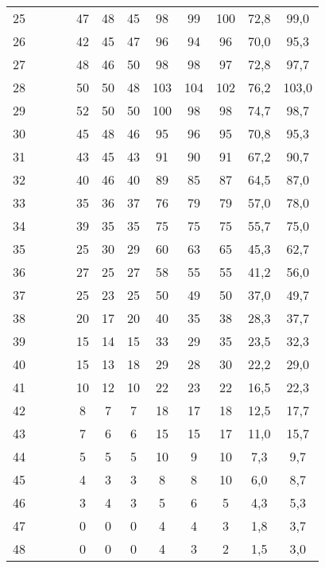 \begin{center}
\begin{longtable}{|c|c|c|c|c|c|c|c|c|c|c|c|}
		25 &   &   &   & 47 & 48 & 45 & 98  & 99  & 100 & 72,8     & 99,0   \\
		26 &   &   &   & 42 & 45 & 47 & 96  & 94  & 96  & 70,0     & 95,3   \\
		27 &   &   &   & 48 & 46 & 50 & 98  & 98  & 97  & 72,8     & 97,7   \\
		28 &   &   &   & 50 & 50 & 48 & 103 & 104 & 102 & 76,2     & 103,0  \\
		29 &   &   &   & 52 & 50 & 50 & 100 & 98  & 98  & 74,7     & 98,7   \\
		30 &   &   &   & 45 & 48 & 46 & 95  & 96  & 95  & 70,8     & 95,3   \\
		31 &   &   &   & 43 & 45 & 43 & 91  & 90  & 91  & 67,2     & 90,7   \\
		32 &   &   &   & 40 & 46 & 40 & 89  & 85  & 87  & 64,5     & 87,0   \\
		33 &   &   &   & 35 & 36 & 37 & 76  & 79  & 79  & 57,0     & 78,0   \\
		34 &   &   &   & 39 & 35 & 35 & 75  & 75  & 75  & 55,7     & 75,0   \\
		35 &   &   &   & 25 & 30 & 29 & 60  & 63  & 65  & 45,3     & 62,7   \\
		36 &   &   &   & 27 & 25 & 27 & 58  & 55  & 55  & 41,2     & 56,0   \\
		37 &   &   &   & 25 & 23 & 25 & 50  & 49  & 50  & 37,0     & 49,7   \\
		38 &   &   &   & 20 & 17 & 20 & 40  & 35  & 38  & 28,3     & 37,7   \\
		39 &   &   &   & 15 & 14 & 15 & 33  & 29  & 35  & 23,5     & 32,3   \\
		40 &   &   &   & 15 & 13 & 18 & 29  & 28  & 30  & 22,2     & 29,0   \\
		41 &   &   &   & 10 & 12 & 10 & 22  & 23  & 22  & 16,5     & 22,3   \\
		42 &   &   &   & 8  & 7  & 7  & 18  & 17  & 18  & 12,5     & 17,7   \\
		43 &   &   &   & 7  & 6  & 6  & 15  & 15  & 17  & 11,0     & 15,7   \\
		44 &   &   &   & 5  & 5  & 5  & 10  & 9   & 10  & 7,3      & 9,7    \\
		45 &   &   &   & 4  & 3  & 3  & 8   & 8   & 10  & 6,0      & 8,7    \\
		46 &   &   &   & 3  & 4  & 3  & 5   & 6   & 5   & 4,3      & 5,3    \\
		47 &   &   &   & 0  & 0  & 0  & 4   & 4   & 3   & 1,8      & 3,7    \\
		48 &   &   &   & 0  & 0  & 0  & 4   & 3   & 2   & 1,5      & 3,0    \\

\end{longtable}
\end{center}
